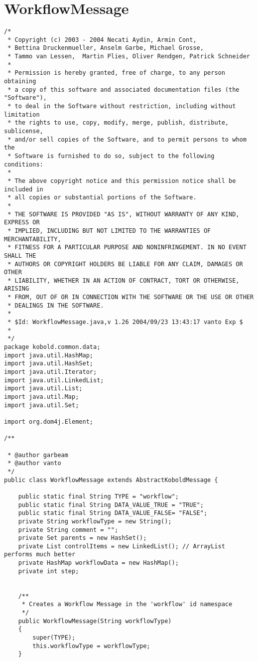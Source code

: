 \section{WorkflowMessage}
\small \begin{verbatim}
/*
 * Copyright (c) 2003 - 2004 Necati Aydin, Armin Cont, 
 * Bettina Druckenmueller, Anselm Garbe, Michael Grosse, 
 * Tammo van Lessen,  Martin Plies, Oliver Rendgen, Patrick Schneider
 * 
 * Permission is hereby granted, free of charge, to any person obtaining
 * a copy of this software and associated documentation files (the "Software"),
 * to deal in the Software without restriction, including without limitation
 * the rights to use, copy, modify, merge, publish, distribute, sublicense, 
 * and/or sell copies of the Software, and to permit persons to whom the 
 * Software is furnished to do so, subject to the following conditions:
 *
 * The above copyright notice and this permission notice shall be included in 
 * all copies or substantial portions of the Software.
 *
 * THE SOFTWARE IS PROVIDED "AS IS", WITHOUT WARRANTY OF ANY KIND, EXPRESS OR 
 * IMPLIED, INCLUDING BUT NOT LIMITED TO THE WARRANTIES OF MERCHANTABILITY, 
 * FITNESS FOR A PARTICULAR PURPOSE AND NONINFRINGEMENT. IN NO EVENT SHALL THE 
 * AUTHORS OR COPYRIGHT HOLDERS BE LIABLE FOR ANY CLAIM, DAMAGES OR OTHER 
 * LIABILITY, WHETHER IN AN ACTION OF CONTRACT, TORT OR OTHERWISE, ARISING 
 * FROM, OUT OF OR IN CONNECTION WITH THE SOFTWARE OR THE USE OR OTHER 
 * DEALINGS IN THE SOFTWARE.
 *
 * $Id: WorkflowMessage.java,v 1.26 2004/09/23 13:43:17 vanto Exp $
 *
 */
package kobold.common.data;
import java.util.HashMap;
import java.util.HashSet;
import java.util.Iterator;
import java.util.LinkedList;
import java.util.List;
import java.util.Map;
import java.util.Set;

import org.dom4j.Element;

/**
 
 * @author garbeam
 * @author vanto
 */
public class WorkflowMessage extends AbstractKoboldMessage {
	
	public static final String TYPE = "workflow";
	public static final String DATA_VALUE_TRUE = "TRUE";
	public static final String DATA_VALUE_FALSE= "FALSE";
	private String workflowType = new String();
	private String comment = "";
	private Set parents = new HashSet();
	private List controlItems = new LinkedList(); // ArrayList performs much better
	private HashMap workflowData = new HashMap();
	private int step;


	/**
	 * Creates a Workflow Message in the 'workflow' id namespace
	 */
	public WorkflowMessage(String workflowType)
	{
		super(TYPE);
		this.workflowType = workflowType;
	}
	

\end{verbatim}
